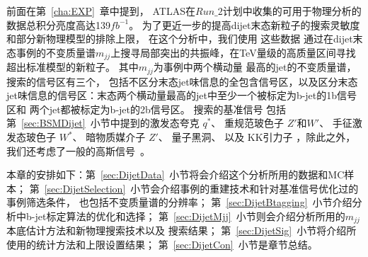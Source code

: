 前面在第~\ref{cha:EXP}~章中提到，
ATLAS在$Run\_2$计划中收集的可用于物理分析的数据总积分亮度高达139$fb^{-1}$。
为了更近一步的提高dijet末态新粒子的搜索灵敏度和部分新物理模型的排除上限，
在这个分析中，我们使用
这些数据
通过在dijet末态事例的不变质量谱$m_{jj}$上搜寻局部突出的共振峰，在TeV量级的高质量区间寻找超出标准模型的新粒子。
其中$m_{jj}$为事例中两个横动量
最高的jet的不变质量谱，搜索的信号区有三个，
包括不区分末态jet味信息的全包含信号区，以及区分末态jet味信息的信号区：末态两个横动量最高的jet中至少一个被标定为b-jet的1b信号区和
两个jet都被标定为b-jet的2b信号区。
搜索的基准信号%
包括第~\ref{sec:BSMDijet}~小节中提到的激发态夸克
$q^*$、
重规范玻色子
$Z\prime$和$W\prime$、
手征激发态玻色子
$W^*$、
暗物质媒介子
$Z\prime$、
量子黑洞、
以及
KK引力子
，除此之外，我们还考虑了一般的高斯信号~\cite{EXOT-2013-11}。


本章的安排如下：第~\ref{sec:DijetData}~小节将会介绍这个分析所用的数据和MC样本；
第~\ref{sec:DijetSelection}~小节会介绍事例的重建技术和针对基准信号优化过的事例筛选条件，
也包括不变质量谱的分辨率；
第~\ref{sec:DijetBtagging}~小节介绍分析中b-jet标定算法的优化和选择；
第~\ref{sec:DijetMjj}~小节则会介绍分析所用的$m_{jj}$本底估计方法和新物理搜索技术以及
搜索结果；
第~\ref{sec:DijetSig}~小节将介绍所使用的统计方法和上限设置结果；
第~\ref{sec:DijetCon}~小节是章节总结。

